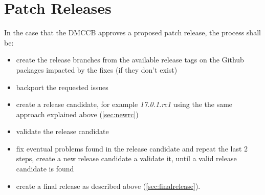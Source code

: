 \newpage

\section{Patch Releases} \label{sec:patchreleases}

In the case that the DMCCB approves a proposed patch release, the process shall be:

\begin{itemize}
\item create the release branches from the available release tags on the Github packages impacted by the fixes (if they don't exist)
\item backport the requested issues
\item create a release candidate, for example \textit{17.0.1.rc1} using the the same approach explained above (\ref{sec:newrc})
\item validate the release candidate
\item fix eventual problems found in the release candidate and repeat the last 2 steps, create a new release candidate a validate it, until a valid release candidate is found
\item create a final release as described above (\ref{sec:finalrelease}).
\end{itemize}


